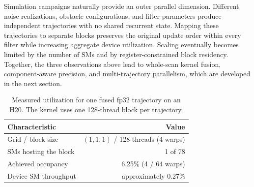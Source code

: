 Simulation campaigns naturally provide an outer parallel dimension. Different noise realizations, obstacle configurations, and filter parameters produce independent trajectories with no shared recurrent state. Mapping these trajectories to separate blocks preserves the original update order within every filter while increasing aggregate device utilization. Scaling eventually becomes limited by the number of SMs and by register-constrained block residency. Together, the three observations above lead to whole-scan kernel fusion, component-aware precision, and multi-trajectory parallelism, which are developed in the next section.

\begin{table}[H]
  \centering
  \caption{Measured utilization for one fused fp32 trajectory on an H20. The kernel uses one 128-thread block per trajectory.}
  \label{tab:motivation-utilization}
  \begin{tabular}{@{}lr@{}}
    \toprule
    Characteristic & Value \\
    \midrule
    Grid / block size & $(1,1,1)$ / 128 threads (4 warps) \\
    SMs hosting the block & 1 of 78 \\
    Achieved occupancy & 6.25\% (4 / 64 warps) \\
    Device SM throughput & approximately 0.27\% \\
    \bottomrule
  \end{tabular}
\end{table}
